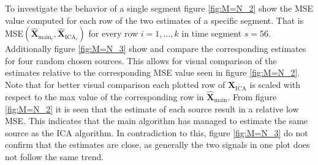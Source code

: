 \noindent
To investigate the behavior of a single segment figure \ref{fig:M=N_2} show the MSE value computed for each row of the two estimates of a specific segment. 
That is MSE$\left(\hat{\mathbf{X}}_{\text{main}_{i}}, \hat{\mathbf{X}}_{\text{ICA}_{i}}\right)$ for every row $i = 1, \dots, k$ in time segment $s = 56$. 
Additionally figure \ref{fig:M=N_3} show and compare the corresponding estimates for four random chosen sources. 
This allows for visual comparison of the estimates relative to the corresponding MSE value seen in figure \ref{fig:M=N_2}. 
Note that for better visual comparison each plotted row of $\hat{\mathbf{X}}_{\text{ICA}}$ is scaled with respect to the max value of the corresponding row in $\hat{\mathbf{X}}_{\text{main}}$.
From figure \ref{fig:M=N_2} it is seen that the estimate of each source result in a relative low MSE. This indicates that the main algorithm has managed to estimate the same source as the ICA algorithm. 
In contradiction to this, figure \ref{fig:M=N_3} do not confirm that the estimates are close, as generally the two signals in one plot does not follow the same trend.   
